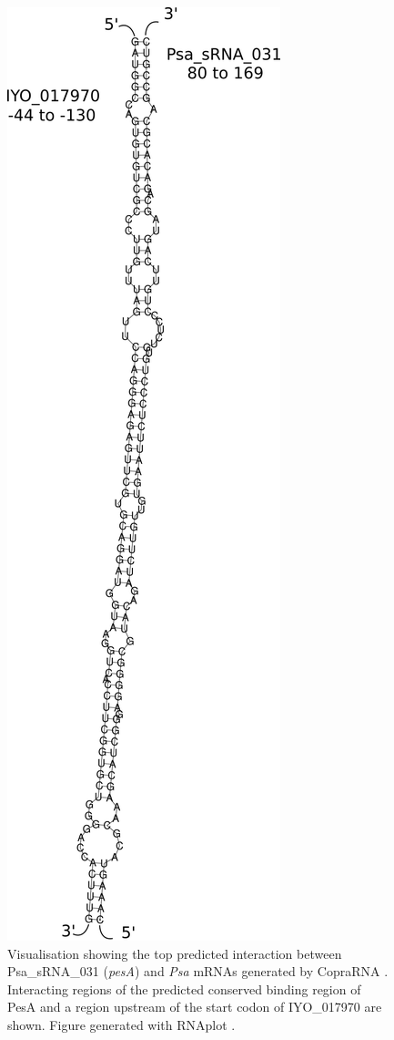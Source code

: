 \begin{figure}
\centering
    \includegraphics[scale=0.72]{psa/psa_ncRNA/pesa_iyo_017970.png}
    \caption[CopraRNA predicted interaction between Psa\_sRNA\_031 and IYO\_017970]{Visualisation showing the top predicted interaction between Psa\_sRNA\_031 (\textit{pesA}) and \textit{Psa} mRNAs generated by CopraRNA \citep{Wright2014-vh,Wright2013-cc}. Interacting regions of the predicted conserved binding region of PesA and a region upstream of the start codon of IYO_017970  are shown. Figure generated with RNAplot \citep{Lorenz2011-wt}. }

\end{figure}
